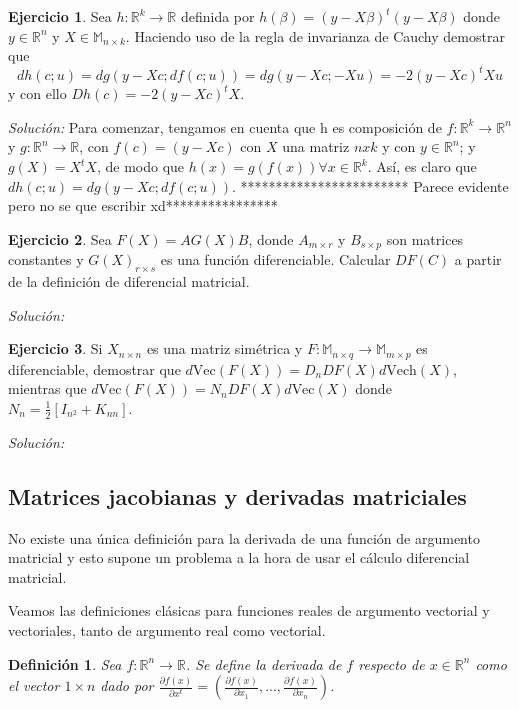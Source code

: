\documentclass{article}
\theoremstyle{theorem-style}  %
\theoremstyle{definition}
\newtheorem{definition}{Definición}[section]
\theoremstyle{example-style}
\newtheorem{exercise}{Ejercicio}[section]
\begin{document}
\begin{exercise}
	Sea $h: \mathbb{R}^k \rightarrow \mathbb{R}$ definida por $h(\beta) = (y-X\beta)^t(y-X\beta)$ donde $y \in \mathbb{R}^n$ y $X\in\mathbb{M}_{n\times k}.$ Haciendo uso de la regla de invarianza de Cauchy demostrar que
	$$dh(c;u) = dg(y-Xc;df(c;u)) = dg(y-Xc;-Xu)=-2(y-Xc)^tXu$$
	y con ello $Dh(c)=-2(y-Xc)^tX$.
\end{exercise}
\textit{Solución:}
	Para comenzar, tengamos en cuenta que h es composición de $f: \mathbb{R}^k \rightarrow \mathbb{R}^n$ y $g:\mathbb{R}^n \rightarrow \mathbb{R}$, con $f(c) = (y-Xc)$ con $X$ una matriz $nxk$ y con $y \in \mathbb{R}^n$; y $g(X) = X^tX$, de modo que $h(x)=g(f(x)) \forall x \in  \mathbb{R}^k$. Así, es claro que  $dh(c;u) = dg(y-Xc;df(c;u))$. ************************ Parece evidente pero no se que escribir xd****************
\begin{exercise}
	Sea $F(X)=AG(X)B$, donde $A_{m\times r}$ y $B_{s\times p}$ son matrices constantes y $G(X)_{r\times s}$ es una función diferenciable. Calcular $DF(C)$ a partir de la definición de diferencial matricial.
\end{exercise}
\textit{Solución:}

\begin{exercise}
	Si $X_{n\times n}$ es una matriz simétrica y $F: \mathbb{M}_{n\times q} \rightarrow \mathbb{M}_{m\times p}$ es diferenciable, demostrar que $d\text{Vec}(F(X)) = D_nDF(X)d\text{Vech}(X)$, mientras que $d\text{Vec}(F(X)) = N_nDF(X)d\text{Vec}(X)$ donde $N_n = \frac{1}{2}[I_{n^2}+K_{nn}]$.
\end{exercise}
\textit{Solución:}


\subsection{Matrices jacobianas y derivadas matriciales}

No existe una única definición para la derivada de una función de argumento matricial y esto supone un problema a la hora de usar el cálculo diferencial matricial.

Veamos las definiciones clásicas para funciones reales de argumento vectorial y vectoriales, tanto de argumento real como vectorial.

\begin{definition}
	\textit{Sea $f:\mathbb{R}^n\rightarrow \mathbb{R}$. Se define la derivada de $f$ respecto de $x\in \mathbb{R}^n$ como el vector $1\times n$ dado por $\displaystyle \frac{\partial f(x)}{\partial x^t} = \displaystyle \left( \frac{\partial f(x)}{\partial x_1},..., \frac{\partial f(x)}{\partial x_n} \right)$.}
\end{definition}
\end{document}
